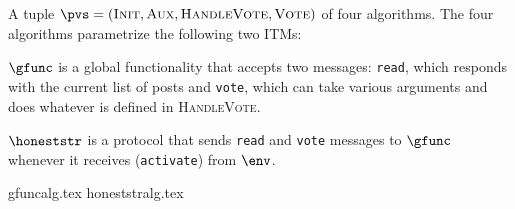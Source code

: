 \begin{definition}
  A tuple $\pvs = \left(\textsc{Init}, \textsc{Aux}, \textsc{HandleVote},
  \textsc{Vote}\right)$ of four algorithms. The four algorithms parametrize the
  following two ITMs:

  $\gfunc$ is a global functionality that accepts two messages: \texttt{read},
  which responds with the current list of posts and \texttt{vote}, which can
  take various arguments and does whatever is defined in \textsc{HandleVote}.

  $\honeststr$ is a protocol that sends \texttt{read} and \texttt{vote}
  messages to $\gfunc$ whenever it receives (\texttt{activate}) from $\env$.
\end{definition}
{gfuncalg.tex}
{honeststralg.tex}
